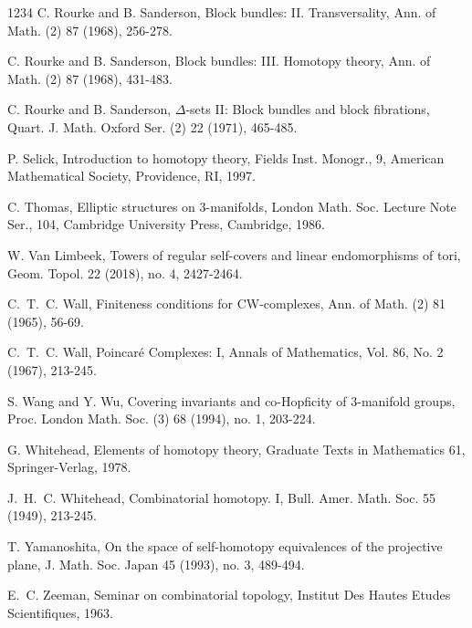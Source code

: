 \documentclass[12pt]{amsart}
\theoremstyle{plain}
\theoremstyle{definition}
\theoremstyle{question}
\theoremstyle{remark}
\theoremstyle{assumption}
\numberwithin{equation}{section}
\theoremstyle{bigthm}
\begin{document}
\begin{thebibliography}{1234}
 C. Rourke and B. Sanderson, Block bundles: II. Transversality, Ann. of Math. (2) 87 (1968), 256-278.

 C. Rourke and B. Sanderson, Block bundles: III. Homotopy theory, Ann. of Math. (2) 87 (1968), 431-483.

 C. Rourke and B. Sanderson, $\Delta$-sets II: Block bundles and block fibrations, Quart. J. Math. Oxford Ser. (2) 22 (1971), 465-485.

 P. Selick, Introduction to homotopy theory, Fields Inst. Monogr., 9, American Mathematical Society, Providence, RI, 1997.

 C. Thomas, Elliptic structures on $3$-manifolds, London Math. Soc. Lecture Note Ser., 104, Cambridge University Press, Cambridge, 1986.

 W. Van Limbeek, Towers of regular self-covers and linear endomorphisms of tori, Geom. Topol. 22 (2018), no. 4, 2427-2464.

 C.~T.~C. Wall, Finiteness conditions for CW-complexes, Ann. of Math. (2) 81 (1965), 56-69.

 C.~T.~C. Wall, Poincar\'{e} Complexes: I, Annals of Mathematics, Vol. 86, No. 2 (1967), 213-245.

 S. Wang and Y. Wu, Covering invariants and co-Hopficity of 3-manifold groups, Proc. London Math. Soc. (3) 68 (1994), no. 1, 203-224.

 G. Whitehead, Elements of homotopy theory, Graduate Texts in Mathematics 61, Springer-Verlag, 1978.

 J.~H.~C. Whitehead, Combinatorial homotopy. I, Bull. Amer. Math. Soc. 55 (1949), 213-245.

 T. Yamanoshita, On the space of self-homotopy equivalences of the projective plane, J. Math. Soc. Japan 45 (1993), no. 3, 489-494.

 E.~C. Zeeman, Seminar on combinatorial topology, Institut Des Hautes Etudes Scientifiques, 1963.

\end{thebibliography}
\end{document}
